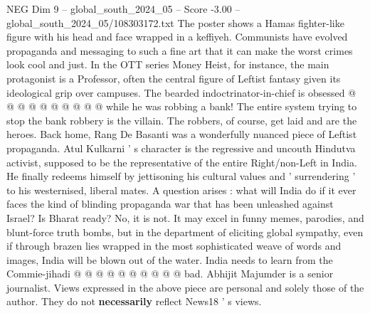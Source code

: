 \begin{textsample}{NEG Dim 9 – global\_south\_2024\_05 – Score -3.00 – global\_south\_2024\_05/108303172.txt}
The poster shows a Hamas fighter-like figure with his head and face wrapped in a keffiyeh.
Communists have evolved propaganda and messaging to such a fine art that it can make the worst crimes look cool and just.
In the OTT series Money Heist, for instance, the main protagonist is a Professor, often the central figure of Leftist fantasy given its ideological grip over campuses.
The bearded indoctrinator-in-chief is obsessed @ @ @ @ @ @ @ @ @ @ while he was robbing a bank!
The entire system trying to stop the bank robbery is the villain.
The robbers, of course, get laid and are the heroes.
Back home, Rang De Basanti was a wonderfully nuanced piece of Leftist propaganda.
Atul Kulkarni ' s character is the regressive and uncouth Hindutva activist, supposed to be the representative of the entire Right/non-Left in India.
He finally redeems himself by jettisoning his cultural values and ' surrendering ' to his westernised, liberal mates.
A question arises : what will India do if it ever faces the kind of blinding propaganda war that has been unleashed against Israel?
Is Bharat ready?
No, it is not.
It may excel in funny memes, parodies, and blunt-force truth bombs, but in the department of eliciting global sympathy, even if through brazen lies wrapped in the most sophisticated weave of words and images, India will be blown out of the water.
India needs to learn from the Commie-jihadi @ @ @ @ @ @ @ @ @ @ bad.
Abhijit Majumder is a senior journalist.
Views expressed in the above piece are personal and solely those of the author.
They do not \textbf{necessarily} reflect News18 ' s views.

\end{textsample}
